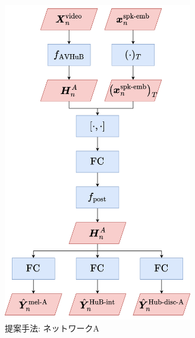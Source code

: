 \begin{figure}[bt]
    \centering
    \includegraphics[height=140mm]{./figure/sec4/model_2/networkA.drawio.png}
    \caption{提案手法: ネットワークA}
    \label{sec4:fig:networkA}
\end{figure}

